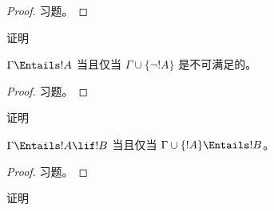 \documentclass[../../../include/open-logic-section]{subfiles}
\begin{document}
\begin{proof}
习题。
\end{proof}

\begin{prob}
证明 
\end{prob}

\begin{prop}
  $\Gamma \Entails !A$ 当且仅当 $\Gamma \cup \{\lnot !A\}$
  是不可满足的。
\end{prop}

\begin{proof}
习题。
\end{proof}

\begin{prob}
证明 
\end{prob}

\begin{thm}[语义演绎定理]
   $\Gamma \Entails !A \lif !B$ 当且仅当
  $\Gamma \cup \{!A\} \Entails !B$。
\end{thm}

\begin{proof}
习题。
\end{proof}

\begin{prob}
证明 
\end{prob}
\end{document}

